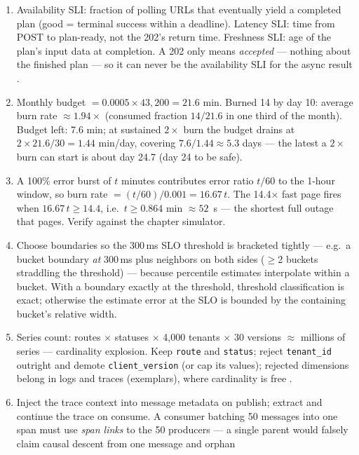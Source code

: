 \begin{enumerate}[leftmargin=2.2em]
  \item Availability SLI: fraction of polling URLs that eventually yield a
    completed plan (good = terminal success within a deadline). Latency
    SLI: time from POST to plan-ready, not the 202's return time. Freshness
    SLI: age of the plan's input data at completion. A 202 only means
    \emph{accepted} --- nothing about the finished plan --- so it can never
    be the availability SLI for the async result \cite{beyer2016sre}.
  \item Monthly budget $= 0.0005 \times 43{,}200 = 21.6$ min. Burned 14 by
    day 10: average burn rate $\approx 1.94\times$ (consumed fraction
    $14/21.6$ in one third of the month). Budget left: 7.6 min; at
    sustained $2\times$ burn the budget drains at $2 \times 21.6/30 =
    1.44$ min/day, covering $7.6/1.44 \approx 5.3$ days --- the latest a
    $2\times$ burn can start is about day 24.7 (day 24 to be safe).
  \item A 100\% error burst of $t$ minutes contributes error ratio $t/60$
    to the 1-hour window, so burn rate $= (t/60)/0.001 = 16.67\,t$. The
    14.4$\times$ fast page fires when $16.67\,t \ge 14.4$, i.e.\ $t \ge
    0.864$ min $\approx 52$~s --- the shortest full outage that pages.
    Verify against the chapter simulator.
  \item Choose boundaries so the 300\,ms SLO threshold is bracketed tightly
    --- e.g.\ a bucket boundary \emph{at} 300\,ms plus neighbors on both
    sides ($\ge$2 buckets straddling the threshold) --- because percentile
    estimates interpolate within a bucket. With a boundary exactly at the
    threshold, threshold classification is exact; otherwise the estimate
    error at the SLO is bounded by the containing bucket's relative width.
  \item Series count: routes $\times$ statuses $\times$ 4{,}000 tenants
    $\times$ 30 versions $\approx$ millions of series --- cardinality
    explosion. Keep \texttt{route} and \texttt{status}; reject
    \texttt{tenant\_id} outright and demote \texttt{client\_version} (or
    cap its values); rejected dimensions belong in logs and traces
    (exemplars), where cardinality is free \cite{opentelemetrydocs}.
  \item Inject the trace context into message metadata on publish; extract
    and continue the trace on consume. A consumer batching 50 messages into
    one span must use \emph{span links} to the 50 producers --- a single
    parent would falsely claim causal descent from one message and orphan

\end{enumerate}
